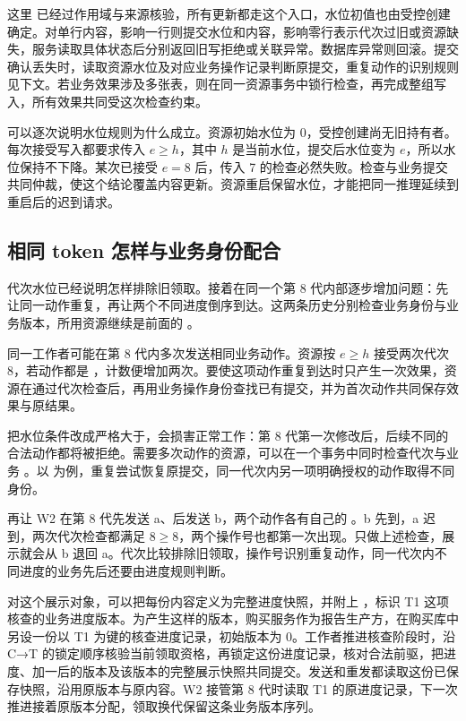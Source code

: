 这里  已经过作用域与来源核验，所有更新都走这个入口，水位初值也由受控创建确定。对单行内容，影响一行则提交水位和内容，影响零行表示代次过旧或资源缺失，服务读取具体状态后分别返回旧写拒绝或关联异常。数据库异常则回滚。提交确认丢失时，读取资源水位及对应业务操作记录判断原提交，重复动作的识别规则见下文。若业务效果涉及多张表，则在同一资源事务中锁行检查，再完成整组写入，所有效果共同受这次检查约束。


可以逐次说明水位规则为什么成立。资源初始水位为 0，受控创建尚无旧持有者。每次接受写入都要求传入 \(e\geq h\)，其中 \(h\) 是当前水位，提交后水位变为 \(e\)，所以水位保持不下降。某次已接受 \(e=8\) 后，传入 7 的检查必然失败。检查与业务提交共同仲裁，使这个结论覆盖内容更新。资源重启保留水位，才能把同一推理延续到重启后的迟到请求。

\subsection*{相同 token 怎样与业务身份配合}

代次水位已经说明怎样排除旧领取。接着在同一个第 8 代内部逐步增加问题：先让同一动作重复，再让两个不同进度倒序到达。这两条历史分别检查业务身份与业务版本，所用资源继续是前面的 。

同一工作者可能在第 8 代内多次发送相同业务动作。资源按 \(e\geq h\) 接受两次代次 8，若动作都是 ，计数便增加两次。要使这项动作重复到达时只产生一次效果，资源在通过代次检查后，再用业务操作身份查找已有提交，并为首次动作共同保存效果与原结果。

把水位条件改成严格大于，会损害正常工作：第 8 代第一次修改后，后续不同的合法动作都将被拒绝。需要多次动作的资源，可以在一个事务中同时检查代次与业务 。以  为例，重复尝试恢复原提交，同一代次内另一项明确授权的动作取得不同身份。

再让 W2 在第 8 代先发送 a、后发送 b，两个动作各有自己的 。b 先到，a 迟到，两次代次检查都满足 \(8\geq 8\)，两个操作号也都第一次出现。只做上述检查，展示就会从 b 退回 a。代次比较排除旧领取，操作号识别重复动作，同一代次内不同进度的业务先后还要由进度规则判断。

对这个展示对象，可以把每份内容定义为完整进度快照，并附上 ，标识 T1 这项核查的业务进度版本。为产生这样的版本，购买服务作为报告生产方，在购买库中另设一份以 T1 为键的核查进度记录，初始版本为 0。工作者推进核查阶段时，沿 C→T 的锁定顺序核验当前领取资格，再锁定这份进度记录，核对合法前驱，把进度、加一后的版本及该版本的完整展示快照共同提交。发送和重发都读取这份已保存快照，沿用原版本与原内容。W2 接管第 8 代时读取 T1 的原进度记录，下一次推进接着原版本分配，领取换代保留这条业务版本序列。

